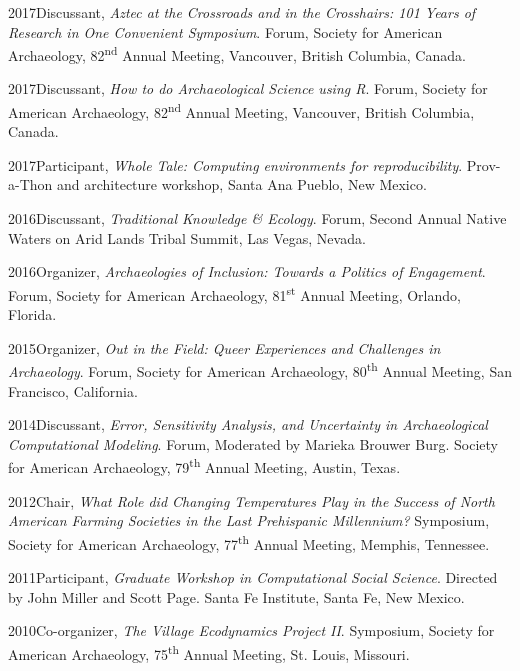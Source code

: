 2017\hspace{.2cm}Discussant, \emph{Aztec at the Crossroads and in the Crosshairs: 101 Years of Research in One Convenient Symposium}. Forum, Society for American Archaeology, 82\textsuperscript{nd} Annual Meeting, Vancouver, British Columbia, Canada.

2017\hspace{.2cm}Discussant, \emph{How to do Archaeological Science using R}. Forum, Society for American Archaeology, 82\textsuperscript{nd} Annual Meeting, Vancouver, British Columbia, Canada.

2017\hspace{.2cm}Participant, \emph{Whole Tale: Computing environments for reproducibility}. Prov-a-Thon and architecture workshop, Santa Ana Pueblo, New Mexico.

2016\hspace{.2cm}Discussant, \emph{Traditional Knowledge \& Ecology}. Forum, Second Annual Native Waters on Arid Lands Tribal Summit, Las Vegas, Nevada.

2016\hspace{.2cm}Organizer, \emph{Archaeologies of Inclusion: Towards a Politics of Engagement}. Forum, Society for American Archaeology, 81\textsuperscript{st} Annual Meeting, Orlando, Florida.

2015\hspace{.2cm}Organizer, \emph{Out in the Field: Queer Experiences and Challenges in Archaeology}. Forum, Society for American Archaeology, 80\textsuperscript{th} Annual Meeting, San Francisco, California.

2014\hspace{.2cm}Discussant, \emph{Error, Sensitivity Analysis, and Uncertainty in Archaeological Computational Modeling}. Forum, Moderated by Marieka Brouwer Burg. Society for American Archaeology, 79\textsuperscript{th} Annual Meeting, Austin, Texas.

2012\hspace{.2cm}Chair, \emph{What Role did Changing Temperatures Play in the Success of North American Farming Societies in the Last Prehispanic Millennium?} Symposium, Society for American Archaeology, 77\textsuperscript{th} Annual Meeting, Memphis, Tennessee.

2011\hspace{.2cm}Participant, \emph{Graduate Workshop in Computational Social Science}. Directed by John Miller and Scott Page. Santa Fe Institute, Santa Fe, New Mexico.

2010\hspace{.2cm}Co-organizer, \emph{The Village Ecodynamics Project II}. Symposium, Society for American Archaeology, 75\textsuperscript{th} Annual Meeting, St. Louis, Missouri.
